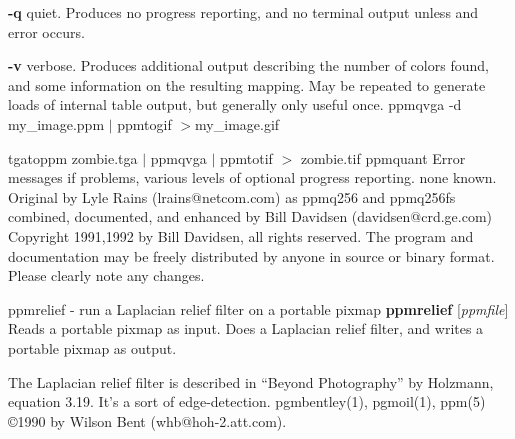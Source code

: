 {\bf -q}
quiet. Produces no progress reporting, and no terminal output unless
and error occurs.

{\bf -v}
verbose. Produces additional output describing the number of colors found,
and some information on the resulting mapping. May be repeated to generate
loads of internal table output, but generally only useful once.
ppmqvga -d my\_image.ppm $|$ ppmtogif $>$my\_image.gif

tgatoppm zombie.tga $|$ ppmqvga $|$ ppmtotif $>$ zombie.tif
ppmquant
Error messages if problems, various levels of optional progress reporting.
none known.
Original by Lyle Rains (lrains@netcom.com) as ppmq256 and ppmq256fs
combined, documented, and enhanced by Bill Davidsen (davidsen@crd.ge.com)
Copyright 1991,1992 by Bill Davidsen, all rights reserved.
The program and documentation may be freely distributed by anyone in source
or binary format. Please clearly note any changes.
%
 
%

\newpage
%

ppmrelief - run a Laplacian relief filter on a portable pixmap
{\bf ppmrelief}
{\rm [}{\it ppmfile}{\rm ]}
Reads a portable pixmap as input.
Does a Laplacian relief filter, and writes a portable pixmap as output.
\par
The Laplacian relief filter is described in ``Beyond Photography'' by Holzmann,
equation 3.19.
It's a sort of edge-detection.
pgmbentley(1), pgmoil(1), ppm(5)
\copyright 1990 by Wilson Bent (whb@hoh-2.att.com).
%
 
